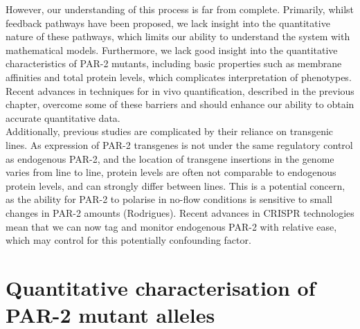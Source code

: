 \documentclass[12pt]{"report"}
\begin{document}
However, our understanding of this process is far from complete. Primarily, whilst feedback pathways have been proposed, we lack insight into the quantitative nature of these pathways, which limits our ability to understand the system with mathematical models. Furthermore, we lack good insight into the quantitative characteristics of PAR-2 mutants, including basic properties such as membrane affinities and total protein levels, which complicates interpretation of phenotypes. Recent advances in techniques for in vivo quantification, described in the previous chapter, overcome some of these barriers and should enhance our ability to obtain accurate quantitative data. \\

Additionally, previous studies are complicated by their reliance on transgenic lines. As expression of PAR-2 transgenes is not under the same regulatory control as endogenous PAR-2, and the location of transgene insertions in the genome varies from line to line, protein levels are often not comparable to endogenous protein levels, and can strongly differ between lines. This is a potential concern, as the ability for PAR-2 to polarise in no-flow conditions is sensitive to small changes in PAR-2 amounts (Rodrigues). Recent advances in CRISPR technologies mean that we can now tag and monitor endogenous PAR-2 with relative ease, which may control for this potentially confounding factor.\\


\section{Quantitative characterisation of PAR-2 mutant alleles}
\end{document}

